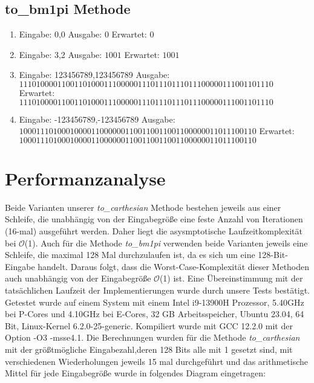 \documentclass[course=erap]{aspdoc}
\begin{document}
    \subsection{to\_bm1pi Methode}
    \begin{enumerate}[label=\roman*)]
        \item Eingabe: 0,0 \quad  Ausgabe: $0$ \quad Erwartet: $0$
        \item Eingabe: 3,2 \quad Ausgabe: $1001$ \quad Erwartet: $1001$
        \item Eingabe: 123456789,123456789 \newline Ausgabe: $111010000110011010001110000011101110111011100000111001101110
        $ \newline Erwartet: $111010000110011010001110000011101110111011100000111001101110
        $
        \item Eingabe: -123456789,-123456789 \newline Ausgabe: $10001110100010000110000001100110011001100000011011100110
        $ \newline Erwartet:
        $10001110100010000110000001100110011001100000011011100110
        $
    \end{enumerate}


    \section{Performanzanalyse}
    Beide Varianten unserer \textit{to\_carthesian} Methode bestehen jeweils aus einer Schleife, die unabhängig von der Eingabegröße eine feste Anzahl von Iterationen (16-mal) ausgeführt werden. Daher liegt die asysmptotische Laufzeitkomplexität bei \( \mathcal{O} \)(1). Auch für die Methode \textit{to\_bm1pi } verwenden beide Varianten jeweils eine Schleife, die maximal 128 Mal durchzulaufen ist, da es sich um eine 128-Bit-Eingabe handelt. Daraus folgt, dass die Worst-Case-Komplexität dieser Methoden auch unabhängig von der Eingabegröße \( \mathcal{O} \)(1) ist.
    Eine Übereinstimmung mit der tatsächlichen Laufzeit der Implementierungen wurde durch unsere Tests bestätigt.
    \vspace{10pt} \newline
    Getestet wurde auf einem System mit einem Intel i9-13900H Prozessor, 5.40GHz bei P-Cores und 4.10GHz bei E-Cores, 32 GB Arbeitsspeicher, Ubuntu 23.04, 64 Bit, Linux-Kernel 6.2.0-25-generic. Kompiliert wurde mit GCC 12.2.0 mit der Option -O3 -msse4.1.
    Die Berechnungen wurden für die Methode \textit{to\_carthesian} mit der größtmögliche Eingabezahl,deren 128 Bits alle mit 1 gesetzt sind, mit verschiedenen Wiederholungen jeweils 15 mal durchgeführt und das arithmetische Mittel für jede Eingabegröße wurde in folgendes Diagram eingetragen:
    \vspace{10pt}
\end{document}
